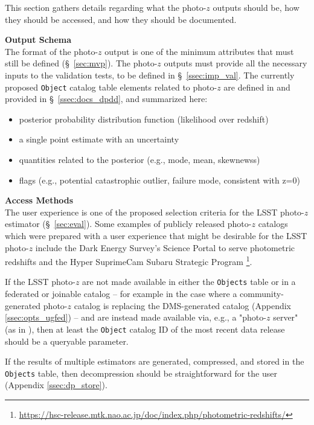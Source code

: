 \documentclass[DM,lsstdraft,toc]{lsstdoc}
\begin{document}
This section gathers details regarding what the photo-$z$ outputs should be, how they should be accessed, and how they should be documented.

{\bf Output Schema}\\
The format of the photo-$z$ output is one of the minimum attributes that must still be defined (\S~\ref{sec:mvp}). 
The photo-$z$ outputs must provide all the necessary inputs to the validation tests, to be defined in \S~\ref{ssec:imp_val}.
The currently proposed {\tt Object} catalog table elements related to photo-$z$ are defined in  and provided in \S~\ref{ssec:docs_dpdd}, and summarized here:
\vspace{-15pt}
\begin{itemize}
\item posterior probability distribution function (likelihood over redshift)
\item a single point estimate with an uncertainty
\item quantities related to the posterior (e.g., mode, mean, skewnewss)
\item flags (e.g., potential catastrophic outlier, failure mode, consistent with z=0)
\end{itemize}

{\bf Access Methods}\\
The user experience is one of the proposed selection criteria for the LSST photo-$z$ estimator (\S~\ref{sec:eval}). 
Some examples of publicly released photo-$z$ catalogs which were prepared with a user experience that might be desirable for the LSST photo-$z$ include the Dark Energy Survey's Science Portal to serve photometric redshifts \cite{2018A&C....25...58G} and the Hyper SuprimeCam Subaru Strategic Program \cite{2018PASJ...70S...9T}\footnote{\url{https://hsc-release.mtk.nao.ac.jp/doc/index.php/photometric-redshifts/}}.

If the LSST photo-$z$ are not made available in either the {\tt Objects} table or in a federated or joinable catalog -- for example in the case where a community-generated photo-$z$ catalog is replacing the DMS-generated catalog (Appendix \ref{ssec:opts_ugfed}) -- and are instead made available via, e.g., a "photo-$z$ server" (as in \cite{2018A&C....25...58G}), then at least the {\tt Object} catalog ID of the most recent data release should be a queryable parameter.

If the results of multiple estimators are generated, compressed, and stored in the {\tt Objects} table, then decompression should be straightforward for the user (Appendix \ref{ssec:dp_store}).
\end{document}
